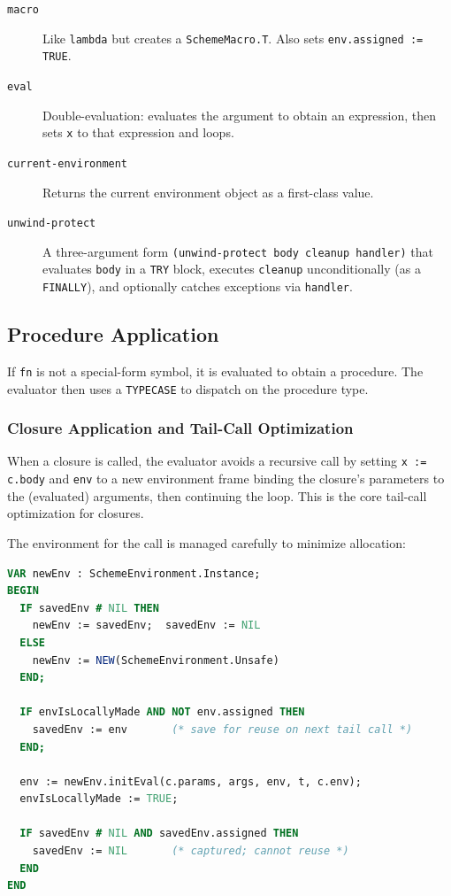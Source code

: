 \documentclass[12pt]{report}
\begin{document}
\begin{description}
\item[\texttt{macro}] Like \texttt{lambda} but creates a
  \texttt{SchemeMacro.T}.  Also sets \texttt{env.assigned := TRUE}.

\item[\texttt{eval}] Double-evaluation: evaluates the argument to
  obtain an expression, then sets \texttt{x} to that expression and
  loops.

\item[\texttt{current-environment}] Returns the current environment
  object as a first-class value.

\item[\texttt{unwind-protect}] A three-argument form
  \texttt{(unwind-protect body cleanup handler)} that evaluates
  \texttt{body} in a \texttt{TRY} block, executes \texttt{cleanup}
  unconditionally (as a \texttt{FINALLY}), and optionally catches
  exceptions via \texttt{handler}.
\end{description}

\subsection{Procedure Application}

If \texttt{fn} is not a special-form symbol, it is evaluated
to obtain a procedure.  The evaluator then uses a \texttt{TYPECASE}
to dispatch on the procedure type.

\subsubsection{Closure Application and Tail-Call Optimization}
\label{sec:closure-apply}

When a closure is called, the evaluator avoids a recursive call by
setting \texttt{x~:= c.body} and \texttt{env} to a new environment
frame binding the closure's parameters to the (evaluated) arguments,
then continuing the loop.  This is the core tail-call optimization
for closures.

The environment for the call is managed carefully to minimize allocation:

\begin{lstlisting}[language=Modula3]
VAR newEnv : SchemeEnvironment.Instance;
BEGIN
  IF savedEnv # NIL THEN
    newEnv := savedEnv;  savedEnv := NIL
  ELSE
    newEnv := NEW(SchemeEnvironment.Unsafe)
  END;

  IF envIsLocallyMade AND NOT env.assigned THEN
    savedEnv := env       (* save for reuse on next tail call *)
  END;

  env := newEnv.initEval(c.params, args, env, t, c.env);
  envIsLocallyMade := TRUE;

  IF savedEnv # NIL AND savedEnv.assigned THEN
    savedEnv := NIL       (* captured; cannot reuse *)
  END
END
\end{lstlisting}
\end{document}

